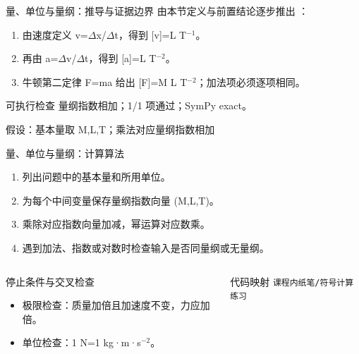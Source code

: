 \begin{frame}[t]{量、单位与量纲：推导与证据边界}
\footnotesize
{}\quad 由本节定义与前置结论逐步推出 ：
\begin{enumerate}
\item 由速度定义 v=\ensuremath{\Delta}x/\allowbreak{}\ensuremath{\Delta}t，得到 [v]=L T\ensuremath{^{-1}}。
\item 再由 a=\ensuremath{\Delta}v/\allowbreak{}\ensuremath{\Delta}t，得到 [a]=L T\ensuremath{^{-2}}。
\item 牛顿第二定律 F=ma 给出 [F]=M L T\ensuremath{^{-2}}；加法项必须逐项相同。
\end{enumerate}\begin{block}{可执行检查}
\quad 量纲指数相加；1/1 项通过；SymPy exact。
\par\scriptsize 假设：基本量取 M,L,T；乘法对应量纲指数相加
\end{block}
\end{frame}

\begin{frame}[t]{量、单位与量纲：计算算法}
\footnotesize
{}\begin{enumerate}
\item 列出问题中的基本量和所用单位。
\item 为每个中间变量保存量纲指数向量 (M,L,T)。
\item 乘除对应指数向量加减，幂运算对应数乘。
\item 遇到加法、指数或对数时检查输入是否同量纲或无量纲。
\end{enumerate}\begin{columns}[T,onlytextwidth]
\begin{block}{停止条件与交叉检查}\scriptsize\begin{itemize}
\item[\CheckMark] 极限检查：质量加倍且加速度不变，力应加倍。
\item[\CheckMark] 单位检查：1 N=1 kg·m·s\ensuremath{^{-2}}。
\end{itemize}\end{block}
\begin{block}{代码映射}
\scriptsize \texttt{课程内纸笔/\allowbreak{}符号计算练习}
\end{block}\end{columns}\end{frame}


